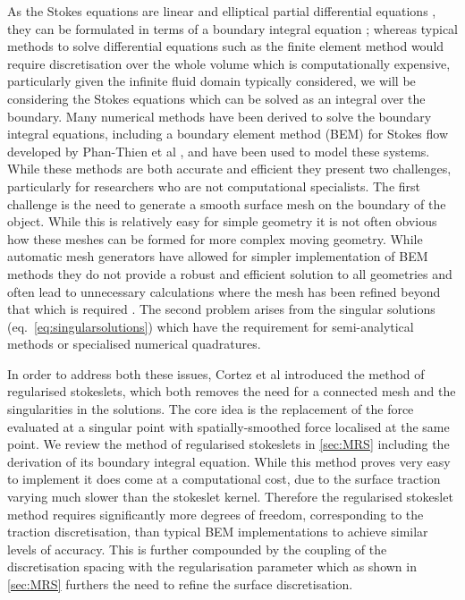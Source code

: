 As the Stokes equations are linear and elliptical partial differential equations \cite{Pozrikidis1992BoundaryFlow}, they can be formulated in terms of a boundary integral equation \cite{Pozrikidis2002ABEMLIB,Acrivos1975StokesSolution,Pozrikidis1992BoundaryFlow,Tran-Cong1987APropulsion,Stakgold1968Boundary2}; whereas typical methods to solve differential equations such as the finite element method \cite{Wagner2001,Kouhia1995} would require discretisation over the whole volume which is computationally expensive, particularly given the infinite fluid domain typically considered, we will be considering the Stokes equations which can be solved as an integral over the boundary. Many numerical methods have been derived to solve the boundary integral equations, including a boundary element method (BEM) for Stokes flow developed by Phan-Thien et al \cite{Tran-Cong1987APropulsion}, and have been used to model these systems. While these methods are both accurate and efficient they present two challenges, particularly for researchers who are not computational specialists. The first challenge is the need to generate a smooth surface mesh on the boundary of the object. While this is relatively easy for simple geometry it is not often obvious how these meshes can be formed for more complex moving geometry. While automatic mesh generators \cite{Pozrikidis2002ABEMLIB,gmsh,schroeder2006visualization} have allowed for simpler implementation of BEM methods they do not provide a robust and efficient solution to all geometries and often lead to unnecessary calculations where the mesh has been refined beyond that which is required \cite{gmsh,schroeder2006visualization}. The second problem arises from the singular solutions (eq.~\ref{eq:singularsolutions}) which have the requirement for semi-analytical methods or specialised numerical quadratures.

In order to address both these issues, Cortez et al \cite{Cortez2001,Cortez2005} introduced the method of regularised stokeslets, which both removes the need for a connected mesh and the singularities in the solutions. The core idea is the replacement of the force evaluated at a singular point with spatially-smoothed force localised at the same point. We review the method of regularised stokeslets in \cref{sec:MRS} including the derivation of its boundary integral equation. While this method proves very easy to implement it does come at a computational cost, due to the surface traction varying much slower than the stokeslet kernel. Therefore the regularised stokeslet method requires significantly more degrees of freedom, corresponding to the traction discretisation, than typical BEM implementations to achieve similar levels of accuracy. This is further compounded by the coupling of the discretisation spacing with the regularisation parameter which as shown in \cref{sec:MRS} furthers the need to refine the surface discretisation. 

